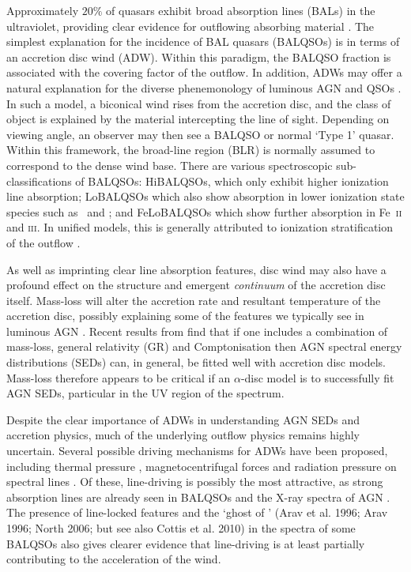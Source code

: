 \documentclass[preprint, a4paper, 11pt]{aastex}
\begin{document}
Approximately $20\%$ of quasars exhibit broad absorption lines (BALs) in the ultraviolet,
providing clear evidence for outflowing absorbing material
\citep{weymann1991, reichard2003, knigge2008, turnermiller2009, allen2011}.
The simplest explanation for the incidence of 
BAL quasars (BALQSOs) is in terms of an accretion disc wind (ADW). 
Within this paradigm, the BALQSO fraction is associated with
the covering factor of the outflow.
In addition, ADWs may offer a natural explanation for the
diverse phenemonology of luminous AGN and QSOs \citep[e.g.][]{MCGV95, elvis2000}. 
In such a model, a biconical wind rises from 
the accretion disc, and the class of object is explained by the material
intercepting the line of sight. Depending on viewing angle, an observer 
may then see a BALQSO or normal `Type 1' quasar.
Within this framework, the broad-line region (BLR) is normally
assumed to correspond to the dense wind base.
There are various spectroscopic sub-classifications of BALQSOs: 
HiBALQSOs, which only exhibit higher
ionization line absorption; LoBALQSOs which also show
absorption in lower ionization state species such as \mg\ and \al; and
FeLoBALQSOs which show further absorption in Fe~\textsc{ii} and \textsc{iii}.
In unified models, this is generally attributed to ionization stratification
of the outflow \citep[e.g.][]{elvis2000}.

As well as imprinting clear line absorption features,
disc wind may also have a profound effect on the structure and 
emergent {\em continuum} of the accretion disc itself.
Mass-loss will alter the accretion rate and resultant 
temperature of the accretion disc, possibly explaining some 
of the features we typically see in luminous AGN \citep{laordavis2014}.
Recent results from \cite{capellupo2015} find 
that if one includes a combination of mass-loss, general relativity (GR) and Comptonisation
then AGN spectral energy distributions (SEDs) can, in general, be fitted well with accretion disc models.
Mass-loss therefore appears to be critical if an $\alpha$-disc
model is to successfully fit AGN SEDs, particular in the UV region of the spectrum.

Despite the clear importance of ADWs in understanding AGN SEDs and accretion physics, 
much of the underlying outflow physics remains highly uncertain. 
Several possible driving mechanisms for ADWs have been proposed, including
thermal pressure \citep{weymann1982, begelman1991}, magnetocentrifugal forces 
\citep{blandfordpayne,pelletier_pudritz} and 
radiation pressure on spectral lines \citep[`line-driving';][]{lucysolomon1970,shlosman1985,MCGV95}.
Of these, line-driving is possibly the most attractive, as
strong absorption lines are already seen in BALQSOs and the X-ray spectra of AGN 
\citep{reeves2003,poundsreeves2009,tombesi2010a}.
The presence of line-locked features \citep{bowler2014} 
and the `ghost of \la' (Arav et al. 1996; Arav 1996; North 2006; but see 
also Cottis et al. 2010) \nocite{arav1995, arav1996, north2006,cottis2010}
in the spectra of some BALQSOs also gives clearer evidence that line-driving is
at least partially contributing to the acceleration of the wind.
\end{document}
